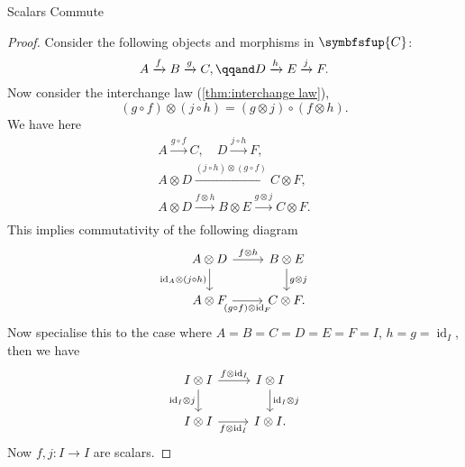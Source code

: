 \documentclass[fleqn]{NotesClass}
\newcommand{\cat}[1]{\symbfsfup{#1}}
\DeclareMathOperator{\id}{id}
\begin{document}
\begin{lma}{Scalars Commute}{}
\begin{proof}
            Consider the following objects and morphisms in \(\cat{C}\):
            \begin{equation}
                A \xrightarrow{f} B \xrightarrow{g} C, \qqand D \xrightarrow{h} E \xrightarrow{j} F.
            \end{equation}
            Now consider the interchange law (\cref{thm:interchange law}),
            \begin{equation}
                (g \circ f) \otimes (j \circ h) = (g \otimes j) \circ (f \otimes h).
            \end{equation}
            We have here
            \begin{gather}
                A \xrightarrow{g \circ f} C, \quad D \xrightarrow{j \circ h} F,\\
                A \otimes D \xrightarrow{(j \circ h) \otimes (g \circ f)} C \otimes F,\\
                A \otimes D \xrightarrow{f \otimes h} B \otimes E \xrightarrow{g \otimes j} C \otimes F.\\
            \end{gather}
            This implies commutativity of the following diagram
            \begin{equation}
                \begin{tikzcd}
                    A \otimes D \arrow[r, "f \otimes h"] \arrow[d, "{\id_A} \otimes (j \circ h)"'] & B \otimes E \arrow[d, "g \otimes j"]\\
                    A \otimes F \arrow[r, "(g \circ f) \otimes \id_F"'] & C \otimes F.
                \end{tikzcd}
            \end{equation}
            Now specialise this to the case where \(A = B = C = D = E = F = I\), \(h = g = \id_I\), then we have
            \begin{equation}
                \begin{tikzcd}
                    I \otimes I \arrow[r, "f \otimes \id_I"] \arrow[d, "{\id_I} \otimes j"'] & I \otimes I \arrow[d, "{\id_I} \otimes j"]\\
                    I \otimes I \arrow[r, "f \otimes \id_I"'] & I \otimes I.
                \end{tikzcd}
            \end{equation}
            Now \(f, j \colon I \to I\) are scalars.
            

\end{proof}
\end{lma}
\end{document}
